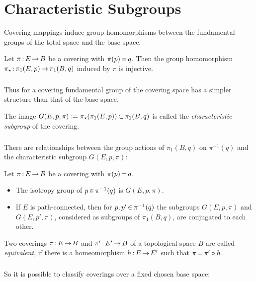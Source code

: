 \documentclass[11pt,twoside]{article}
\def\E{E}
\def\B{B}
\begin{document}
\section{Characteristic Subgroups}
Covering mappings induce group homomorphisms between the
fundamental groups of the total space and the base space.

\begin{theorem1}
Let $\pi \:\E \xto \B$ be a covering with $\pi(p) {\,=\,} q$.
Then the group homomorphism
$\pi_{\*} \: \pi_1(\E,p) \xto \pi_1(\B,q)$ induced by $\pi$ is injective.
\end{theorem1}

\subparagraph{}
Thus for a covering fundamental group of the
covering space has a simpler structure than that of the base space.

\begin{definition} %
The image $G(\E,p,\pi) := \pi_{\*}(\pi_1(\E,p)) \xsubset \pi_1(\B,q)$
is called the \textit{characteristic subgroup} of the covering.
\end{definition}

\subparagraph{}
There are relationships between the group actions of $\pi_1(\B,q)$
on $\pi^{-1}(q)$ and the characteristic subgroup $G(\E,p,\pi)$:

\begin{theorem1}
Let $\pi \: \E \xto \B$ be a covering with $\pi(p) {\,=\,} q$.

\begin{itemize}
\item
The isotropy group of $p {\,\in\,} \pi^{-1}(q)$ is $G(\E,p,\pi)$.

\item
If $\E$ is path-connected,
then for $p,p' {\,\in\,} \pi^{-1}(q)$ the subgroups $G(\E,p,\pi)$
and $G(\E,p',\pi)$,
considered as subgroups of $\pi_1(\B,q)$,
are conjugated to each other.
\end{itemize}
\end{theorem1}

\begin{definition} %
Two coverings $\pi \:\E \xto \B$ and $\pi' \:\E' \xto \B$
of a topological space $\B$ are called \textit{equivalent},
if there is a homeomorphism $h\:\E \xto \E'$
such that $\pi {\,=\,} \pi' \circ h$.
\end{definition}

\subparagraph{}
So it is possible to classify coverings over a fixed chosen base space:
\end{document}
